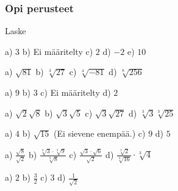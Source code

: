\begin{tehtavasivu}

\subsubsection*{Opi perusteet}

Laske
\begin{tehtava}

\begin{vastaus}
\end{vastaus}
\end{tehtava}

\begin{tehtava}

\begin{vastaus}
a) $3$ b) Ei määritelty c) $2$ d) $-2$  e) $10$
\end{vastaus}
\end{tehtava}

\begin{tehtava}
a) $\sqrt{81}$ \quad b) $\sqrt[3]{27}$ \quad c) $\sqrt[4]{-81}$ \quad d) $\sqrt[8]{256}$ 

\begin{vastaus}
a) $9$ b) $3$ c) Ei määritelty d) $2$
\end{vastaus}
\end{tehtava}

\begin{tehtava} %
a) $\sqrt{2}\sqrt{8}$  \quad b)  $\sqrt{3}\sqrt{5}$ \quad c)  $\sqrt{3}\sqrt{27}$ \quad  d) $\sqrt[3]{3}\sqrt[3]{25} $
\begin{vastaus}
a) $4$ \quad b) $\sqrt{15}$ (Ei sievene enempää.)  \quad c) $9$ \quad d) $5$
\end{vastaus}
\end{tehtava}

\begin{tehtava} 
a) $ \frac{\sqrt{8}}{\sqrt{2}}$  \quad b)   $ \frac{\sqrt[3]{3} \cdot \sqrt[3]{9}}{\sqrt[3]{8}}$   \quad c)  $ \frac{\sqrt{3} \cdot \sqrt{6}}{\sqrt{2}}$ \quad d) $ \frac {\sqrt[3]{2}}{\sqrt[3]{16}} \cdot \sqrt[3]{4}$ 
\begin{vastaus}
a) $2$ \quad b) $\frac{3}{2}$  \quad c) $3$ \quad d) $\frac{1}{\sqrt{2}}$
\end{vastaus}
\end{tehtava}


\end{tehtavasivu}
